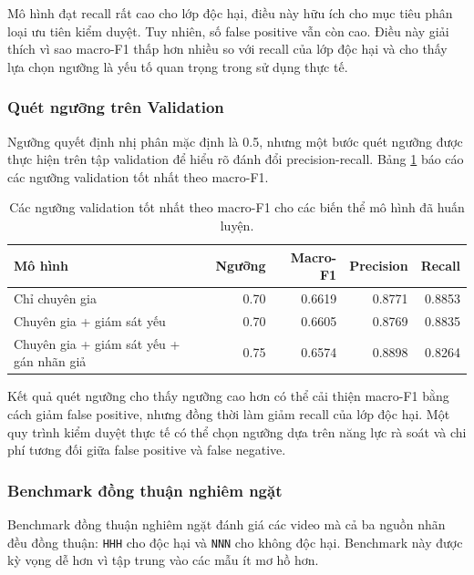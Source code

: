 Mô hình đạt recall rất cao cho lớp độc hại, điều này hữu ích cho mục tiêu phân loại ưu tiên kiểm duyệt. Tuy nhiên, số false positive vẫn còn cao. Điều này giải thích vì sao macro-F1 thấp hơn nhiều so với recall của lớp độc hại và cho thấy lựa chọn ngưỡng là yếu tố quan trọng trong sử dụng thực tế.

\subsubsection{Quét ngưỡng trên Validation}

Ngưỡng quyết định nhị phân mặc định là 0.5, nhưng một bước quét ngưỡng được thực hiện trên tập validation để hiểu rõ đánh đổi precision-recall. Bảng \ref{tab:implementation-threshold-sweep} báo cáo các ngưỡng validation tốt nhất theo macro-F1.

\begin{table}[H]
\centering
\small
\renewcommand{\arraystretch}{1.25}
\begin{tabular}{|l|r|r|r|r|}
\hline
\textbf{Mô hình} & \textbf{Ngưỡng} & \textbf{Macro-F1} & \textbf{Precision} & \textbf{Recall} \\
\hline
Chỉ chuyên gia & 0.70 & 0.6619 & 0.8771 & 0.8853 \\
\hline
Chuyên gia + giám sát yếu & 0.70 & 0.6605 & 0.8769 & 0.8835 \\
\hline
Chuyên gia + giám sát yếu + gán nhãn giả & 0.75 & 0.6574 & 0.8898 & 0.8264 \\
\hline
\end{tabular}
\caption{Các ngưỡng validation tốt nhất theo macro-F1 cho các biến thể mô hình đã huấn luyện.}
\label{tab:implementation-threshold-sweep}
\end{table}

Kết quả quét ngưỡng cho thấy ngưỡng cao hơn có thể cải thiện macro-F1 bằng cách giảm false positive, nhưng đồng thời làm giảm recall của lớp độc hại. Một quy trình kiểm duyệt thực tế có thể chọn ngưỡng dựa trên năng lực rà soát và chi phí tương đối giữa false positive và false negative.

\subsubsection{Benchmark đồng thuận nghiêm ngặt}

Benchmark đồng thuận nghiêm ngặt đánh giá các video mà cả ba nguồn nhãn đều đồng thuận: \texttt{HHH} cho độc hại và \texttt{NNN} cho không độc hại. Benchmark này được kỳ vọng dễ hơn vì tập trung vào các mẫu ít mơ hồ hơn.

